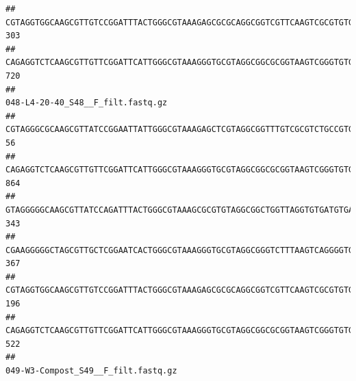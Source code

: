 \documentclass[]{article}
\begin{document}
\begin{verbatim}
## CGTAGGTGGCAAGCGTTGTCCGGATTTACTGGGCGTAAAGAGCGCGCAGGCGGTCGTTCAAGTCGCGTGTGAAAGCCCCCGGCTCAACTGGGGAGGGTCACGCGATACTGATCGACTCGAAGGCAGGAGAGGGTAGTGGAATTCCCGGTGTAGTGGTGAAATGCGTAGATATCGGGAGGAACACCAGTGGCGAAGGCGACTACCTGGCCTGTTCTTGACGCTGAGGCGCGAAAGCTAGGGGAGCAAACG                               303
## CAGAGGTCTCAAGCGTTGTTCGGATTCATTGGGCGTAAAGGGTGCGTAGGCGGCGCGGTAAGTCGGGTGTGAAATCTCGGGGCTTAACTCCGAAACTGCATTCGATACTGCCGTGCTTGAGGACTGGAGAGGAGACTGGAATTTACGGTGTAGCGGTGAAATGCGTAGATATCGTAAGGAAGACCAGTGGCGAAGGCGGGTCTCTGGACAGTTCCTGACGCTGAGGCACGAAGGCCAGGGGAGCAAACG                               720
##                                                                                                                                                                                                                                                           048-L4-20-40_S48__F_filt.fastq.gz
## CGTAGGGCGCAAGCGTTATCCGGAATTATTGGGCGTAAAGAGCTCGTAGGCGGTTTGTCGCGTCTGCCGTGAAAGTCCGGGGCTCAACTCCGGATCTGCGGTGGGTACGGGCAGACTAGAGTGATGTAGGGGAGACTGGAATTCCTGGTGTAGCGGTGAAATGCGCAGATATCAGGAGGAACACCGATGGCGAAGGCAGGTCTCTGGGCATTAACTGACGCTGAGGAGCGAAAGCATGGGGAGCGAACA                                56
## CAGAGGTCTCAAGCGTTGTTCGGATTCATTGGGCGTAAAGGGTGCGTAGGCGGCGCGGTAAGTCGGGTGTGAAATCTCGGAGCTTAACTCCGAAACTGCATTCGATACTGCCGTGCTTGAGGACTGGAGAGGAGACTGGAATTTACGGTGTAGCGGTGAAATGCGTAGATATCGTAAGGAAGACCAGTGGCGAAGGCGGGTCTCTGGACAGTTCCTGACGCTGAGGCACGAAGGCCAGGGGAGCAAACG                               864
## GTAGGGGGCAAGCGTTATCCAGATTTACTGGGCGTAAAGCGCGTGTAGGCGGCTGGTTAGGTGTGATGTGAAATCTTCCGGCTCAACCGGAAAACTGCATTGCAAACCGGCCTGGCTAGAGTGCAGGAGAGGGAAGCGGAATTCCAGGTGTAGCGGTGAAATGCGTAGATATCTGGAGGAACACCAGTGGCGAAGGCGGCTTCCTGGCCTGCAACTGACGCTGAGACGCGAAAGCGTGGGGAGCGAAC                                343
## CGAAGGGGGCTAGCGTTGCTCGGAATCACTGGGCGTAAAGGGTGCGTAGGCGGGTCTTTAAGTCAGGGGTGAAATCCTGGAGCTCAACTCCAGAACTGCCTTTGATACTGAAGATCTTGAGTTCGGGAGAGGTGAGTGGAACTGCGAGTGTAGAGGTGAAATTCGTAGATATTCGCAAGAACACCAGTGGCGAAGGCGGCTCACTGGCCCGATACTGACGCTGAGGCACGAAAGCGTGGGGAGCAAACA                               367
## CGTAGGTGGCAAGCGTTGTCCGGATTTACTGGGCGTAAAGAGCGCGCAGGCGGTCGTTCAAGTCGCGTGTGAAAGCCCCCGGCTCAACTGGGGAGGGTCACGCGATACTGATCGACTCGAAGGCAGGAGAGGGTAGTGGAATTCCCGGTGTAGTGGTGAAATGCGTAGATATCGGGAGGAACACCAGTGGCGAAGGCGACTACCTGGCCTGTTCTTGACGCTGAGGCGCGAAAGCTAGGGGAGCAAACG                               196
## CAGAGGTCTCAAGCGTTGTTCGGATTCATTGGGCGTAAAGGGTGCGTAGGCGGCGCGGTAAGTCGGGTGTGAAATCTCGGGGCTTAACTCCGAAACTGCATTCGATACTGCCGTGCTTGAGGACTGGAGAGGAGACTGGAATTTACGGTGTAGCGGTGAAATGCGTAGATATCGTAAGGAAGACCAGTGGCGAAGGCGGGTCTCTGGACAGTTCCTGACGCTGAGGCACGAAGGCCAGGGGAGCAAACG                               522
##                                                                                                                                                                                                                                                           049-W3-Compost_S49__F_filt.fastq.gz

\end{verbatim}
\end{document}
